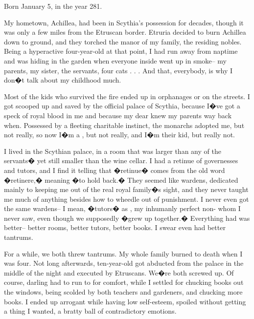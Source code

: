 \documentclass[char]{Kos}
\begin{document}
\name{\cWard{}}

Born January 5, in the year 281.

My hometown, Achillea, had been in Scythia's possession for decades, though it was only a few miles from the Etruscan border. Etruria decided to burn Achillea down to ground, and they torched the manor of my family, the residing nobles. Being a hyperactive four-year-old at that point, I had run away from naptime and was hiding in the garden when everyone inside went up in smoke-- my parents, my sister, the servants, four cats . . . And that, everybody, is why I don�t talk about my childhood much.

Most of the kids who survived the fire ended up in orphanages or on the streets. I got scooped up and saved by the official palace of Scythia, because I�ve got a speck of royal blood in me and because my dear \cQueenTwo{\Monarch} \cQueenTwo{\nickname} knew my parents way back when. Possessed by a fleeting charitable instinct, the monarchs adopted me, but not really, so now I�m a \cWard{\prince}, but not really, and I�m their kid, but really not.

I lived in the Scythian palace, in a room that was larger than any of the servants� yet still smaller than the wine cellar. I had a retinue of governesses and tutors, and I find it telling that �retinue� comes from the old word �retinere,� meaning �to hold back.� They seemed like wardens, dedicated mainly to keeping me out of the real royal family�s sight, and they never taught me much of anything besides how to wheedle out of punishment. I never even got the same wardens-- I mean, �tutors� as \cBride{\nickname}, my inhumanly perfect non-\cBride{\sibling} \cBride{\sibling} whom I never saw, even though we supposedly �grew up together.� Everything \cBride{\nickname} had was better-- better rooms, better tutors, better books. I swear \cBride{\they} even had better tantrums.

For a while, we both threw tantrums. My whole family burned to death when I was four. Not long afterwards, \cBride{\their} ten-year-old \cFugitive{\sibling} \cFugitive{\nickname} got abducted from the palace in the middle of the night and executed by Etruscans. We�re both screwed up. Of course, darling \cBride{\nickname} had \cBride{\their} \cKingTwo{\parent} \cKingTwo{\nickname} to run to for comfort, while I settled for chucking books out the windows, being scolded by both teachers and gardeners, and chucking more books. I ended up arrogant while having low self-esteem, spoiled without getting a thing I wanted, a bratty ball of contradictory emotions. 
\end{document}
